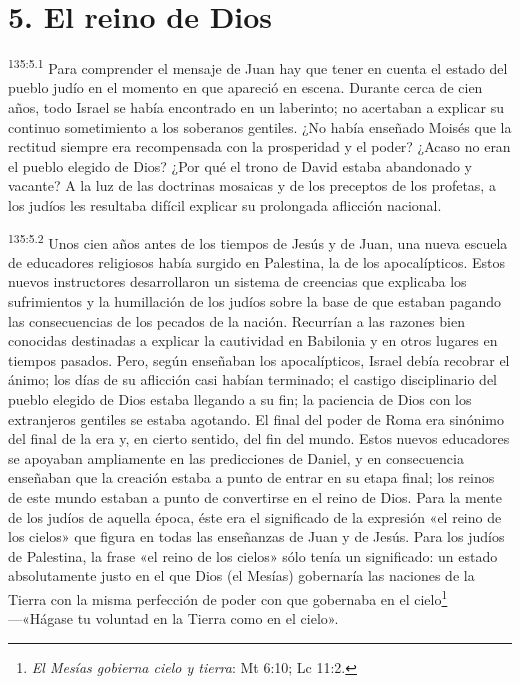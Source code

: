 \section*{5. El reino de Dios}
\par
\textsuperscript{135:5.1} Para comprender el mensaje de Juan hay que tener en cuenta el estado del pueblo judío en el momento en que apareció en escena. Durante cerca de cien años, todo Israel se había encontrado en un laberinto; no acertaban a explicar su continuo sometimiento a los soberanos gentiles. ¿No había enseñado Moisés que la rectitud siempre era recompensada con la prosperidad y el poder? ¿Acaso no eran el pueblo elegido de Dios? ¿Por qué el trono de David estaba abandonado y vacante? A la luz de las doctrinas mosaicas y de los preceptos de los profetas, a los judíos les resultaba difícil explicar su prolongada aflicción nacional.

\par
\textsuperscript{135:5.2} Unos cien años antes de los tiempos de Jesús y de Juan, una nueva escuela de educadores religiosos había surgido en Palestina, la de los apocalípticos. Estos nuevos instructores desarrollaron un sistema de creencias que explicaba los sufrimientos y la humillación de los judíos sobre la base de que estaban pagando las consecuencias de los pecados de la nación. Recurrían a las razones bien conocidas destinadas a explicar la cautividad en Babilonia y en otros lugares en tiempos pasados. Pero, según enseñaban los apocalípticos, Israel debía recobrar el ánimo; los días de su aflicción casi habían terminado; el castigo disciplinario del pueblo elegido de Dios estaba llegando a su fin; la paciencia de Dios con los extranjeros gentiles se estaba agotando. El final del poder de Roma era sinónimo del final de la era y, en cierto sentido, del fin del mundo. Estos nuevos educadores se apoyaban ampliamente en las predicciones de Daniel, y en consecuencia enseñaban que la creación estaba a punto de entrar en su etapa final; los reinos de este mundo estaban a punto de convertirse en el reino de Dios. Para la mente de los judíos de aquella época, éste era el significado de la expresión «el reino de los cielos» que figura en todas las enseñanzas de Juan y de Jesús. Para los judíos de Palestina, la frase «el reino de los cielos» sólo tenía un significado: un estado absolutamente justo en el que Dios (el Mesías) gobernaría las naciones de la Tierra con la misma perfección de poder con que gobernaba en el cielo\footnote{\textit{El Mesías gobierna cielo y tierra}: Mt 6:10; Lc 11:2.} ---«Hágase tu voluntad en la Tierra como en el cielo».

